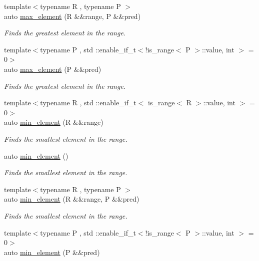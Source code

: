 \begin{DoxyCompactItemize}
{\footnotesize template$<$typename R , typename P $>$ }\\auto \mbox{\hyperlink{namespacerah_a46840028da6087e1ae3348b1ce8ce381}{max\+\_\+element}} (R \&\&range, P \&\&pred)
\begin{DoxyCompactList}\small\item\em Finds the greatest element in the range. \end{DoxyCompactList}\item 
{\footnotesize template$<$typename P , std \+::enable\+\_\+if\+\_\+t$<$!is\+\_\+range$<$ P $>$\+::value, int $>$  = 0$>$ }\\auto \mbox{\hyperlink{namespacerah_a8e6f0498df081347423d319c8ab919d1}{max\+\_\+element}} (P \&\&pred)
\begin{DoxyCompactList}\small\item\em Finds the greatest element in the range. \end{DoxyCompactList}\item 
{\footnotesize template$<$typename R , std \+::enable\+\_\+if\+\_\+t$<$ is\+\_\+range$<$ R $>$\+::value, int $>$  = 0$>$ }\\auto \mbox{\hyperlink{namespacerah_ac30d42caf315f29ed784dd3c4f46d533}{min\+\_\+element}} (R \&\&range)
\begin{DoxyCompactList}\small\item\em Finds the smallest element in the range. \end{DoxyCompactList}\item 
auto \mbox{\hyperlink{namespacerah_a8b5a2712dbebe5144ea1635f3f346514}{min\+\_\+element}} ()
\begin{DoxyCompactList}\small\item\em Finds the smallest element in the range. \end{DoxyCompactList}\item 
{\footnotesize template$<$typename R , typename P $>$ }\\auto \mbox{\hyperlink{namespacerah_ae2ea3fdd33de831fcc7b281154d5a37c}{min\+\_\+element}} (R \&\&range, P \&\&pred)
\begin{DoxyCompactList}\small\item\em Finds the smallest element in the range. \end{DoxyCompactList}\item 
{\footnotesize template$<$typename P , std \+::enable\+\_\+if\+\_\+t$<$!is\+\_\+range$<$ P $>$\+::value, int $>$  = 0$>$ }\\auto \mbox{\hyperlink{namespacerah_a28dcdb4c5a25916a18532f1dbb520aa9}{min\+\_\+element}} (P \&\&pred)

\end{DoxyCompactItemize}
